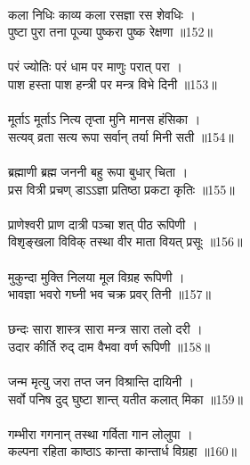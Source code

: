 \\
कला निधिः काव्य कला रसज्ञा रस शेवधिः ।\\
पुष्टा पुरा तना पूज्या पुष्करा पुष्क रेक्षणा ॥152॥\\
\\
परं ज्योतिः परं धाम पर माणुः परात् परा ।\\
पाश हस्ता पाश हन्त्री पर मन्त्र विभे दिनी ॥153॥\\
\\
मूर्ताऽ मूर्ताऽ नित्य तृप्ता मुनि मानस हंसिका ।\\
सत्यव् व्रता सत्य रूपा सर्वान् तर्या मिनी सती ॥154॥\\
\\
ब्रह्माणी ब्रह्म जननी बहु रूपा बुधार् चिता ।\\
प्रस वित्री प्रचण् डाऽऽज्ञा प्रतिष्ठा प्रकटा कृतिः ॥155॥\\
\\
प्राणेश्वरी प्राण दात्री पञ्चा शत् पीठ रूपिणी ।\\
विश‍ृङ्खला विविक् तस्था वीर माता वियत् प्रसूः ॥156॥\\
\\
मुकुन्दा मुक्ति निलया मूल विग्रह रूपिणी ।\\
भावज्ञा भवरो गघ्नी भव चक्र प्रवर् तिनी ॥157॥\\
\\
छन्दः सारा शास्त्र सारा मन्त्र सारा तलो दरी ।\\
उदार कीर्ति रुद् दाम वैभवा वर्ण रूपिणी ॥158॥\\
\\
जन्म मृत्यु जरा तप्त जन विश्रान्ति दायिनी ।\\
सर्वो पनिष दुद् घुष्टा शान्त् यतीत कलात् मिका ॥159॥\\
\\
गम्भीरा गगनान् तस्था गर्विता गान लोलुपा ।\\
कल्पना रहिता काष्ठाऽ कान्ता कान्तार्ध विग्रहा ॥160॥\\
